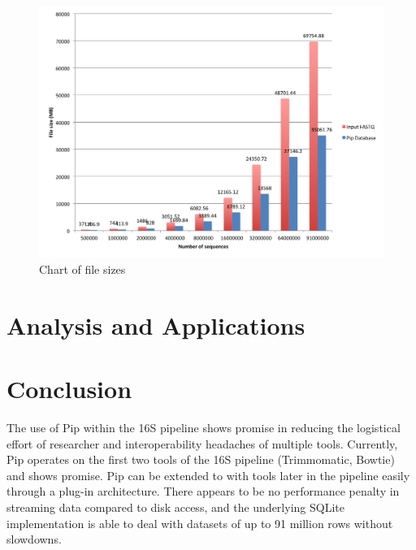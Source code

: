 \documentclass[12pt]{article}
\begin{document}
\begin{figure}[h!]
	\centering
	\includegraphics[width=\textwidth]{filesizes_chart}
	\caption{Chart of file sizes}
	\label{fig:filesizes}
\end{figure}

\section{Analysis and Applications} %
\label{sec:analysis_and_applications}


\section{Conclusion} %
\label{sec:conclusion}
The use of Pip within the 16S pipeline shows promise in reducing the logistical
effort of researcher and interoperability headaches of multiple tools. Currently,
Pip operates on the first two tools of the 16S pipeline (Trimmomatic, Bowtie) and
shows promise. Pip can be extended to with tools later in the pipeline easily through
a plug-in architecture. There appears to be no performance penalty in streaming
data compared to disk access, and the underlying SQLite implementation is able to
deal with datasets of up to 91 million rows without slowdowns.
\end{document}
